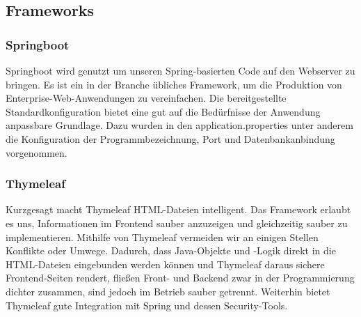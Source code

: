 \subsection{Frameworks}
%
\subsubsection*{Springboot}
Springboot wird genutzt um unseren Spring-basierten Code auf den Webserver zu bringen. Es ist ein in der Branche übliches Framework, um die Produktion von Enterprise-Web-Anwendungen zu vereinfachen. Die bereitgestellte Standardkonfiguration bietet eine gut auf die Bedürfnisse der Anwendung anpassbare Grundlage. Dazu wurden in den \glqq{}application.properties\grqq{} unter anderem die Konfiguration der Programmbezeichnung, Port und Datenbankanbindung vorgenommen.
\subsubsection*{Thymeleaf}
Kurzgesagt macht Thymeleaf HTML-Dateien intelligent. Das Framework erlaubt es uns, Informationen im Frontend sauber anzuzeigen und gleichzeitig sauber zu implementieren. Mithilfe von Thymeleaf vermeiden wir an einigen Stellen Konflikte oder Umwege. Dadurch, dass Java-Objekte und -Logik direkt in die HTML-Dateien eingebunden werden können und Thymeleaf daraus sichere Frontend-Seiten rendert, fließen Front- und Backend zwar in der Programmierung dichter zusammen, sind jedoch im Betrieb sauber getrennt.
Weiterhin bietet Thymeleaf gute Integration mit Spring und dessen Security-Tools.


